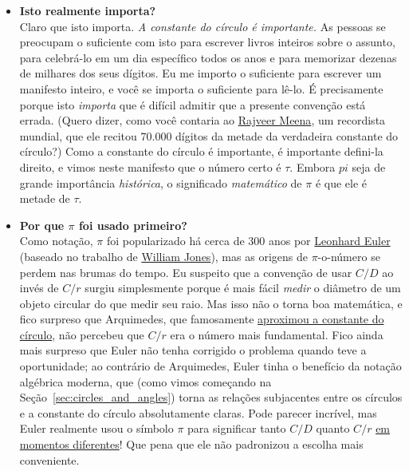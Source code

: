 \begin{itemize}
  \item \textbf{Isto realmente importa?} \\ Claro que isto importa. \emph{A constante do círculo é importante.} As pessoas se preocupam o suficiente com isto para escrever livros inteiros sobre o assunto, para celebrá-lo em um dia específico todos os anos e para memorizar dezenas de milhares dos seus dígitos. Eu me importo o suficiente para escrever um manifesto inteiro, e você se importa o suficiente para lê-lo. É precisamente porque isto \emph{importa} que é difícil admitir que a presente convenção está errada. (Quero dizer, como você contaria ao \href{https://www.guinnessworldrecords.com/world-records/most-pi-places-memorised}{Rajveer Meena}, um recordista mundial, que ele recitou 70.000 dígitos da metade da verdadeira constante do círculo?) Como a constante do círculo é importante, é importante defini-la direito, e vimos neste manifesto que o número certo é $\tau$. Embora $pi$ seja de grande importância \emph{histórica}, o significado \emph{matemático} de $\pi$ é que ele é metade de $\tau$.

  \item \textbf{Por que $\pi$ foi usado primeiro?} \\ Como notação, $\pi$ foi popularizado há cerca de 300 anos por \href{https://pt.wikipedia.org/wiki/Leonhard_Euler}{Leonhard Euler} (baseado no trabalho de \href{https://pt.wikipedia.org/wiki/William_Jones_(matem%C3%A1tico)}{William Jones}), mas as origens de $\pi$-o-número se perdem nas brumas do tempo. Eu suspeito que a convenção de usar $C/D$ ao invés de $C/r$ surgiu simplesmente porque é mais fácil \emph{medir} o diâmetro de um objeto circular do que medir seu raio. Mas isso não o torna boa matemática, e fico surpreso que Arquimedes, que famosamente \href{http://itech.fgcu.edu/faculty/clindsey/mhf4404/archimedes/archimedes.html}{aproximou a constante do círculo}, não percebeu que $C/r$ era o número mais fundamental. Fico ainda mais surpreso que Euler não tenha corrigido o problema quando teve a oportunidade; ao contrário de Arquimedes, Euler tinha o benefício da notação algébrica moderna, que (como vimos começando na Seção~\ref{sec:circles_and_angles}) torna as relações subjacentes entre os círculos e a constante do círculo absolutamente claras. Pode parecer incrível, mas Euler realmente usou o símbolo $\pi$ para significar tanto $C/D$ quanto $C/r$ \href{https://en.wikipedia.org/wiki/Pi#Adoption_of_the_symbol_%CF%80}{em momentos diferentes}! Que pena que ele não padronizou a escolha mais conveniente.


\end{itemize}
